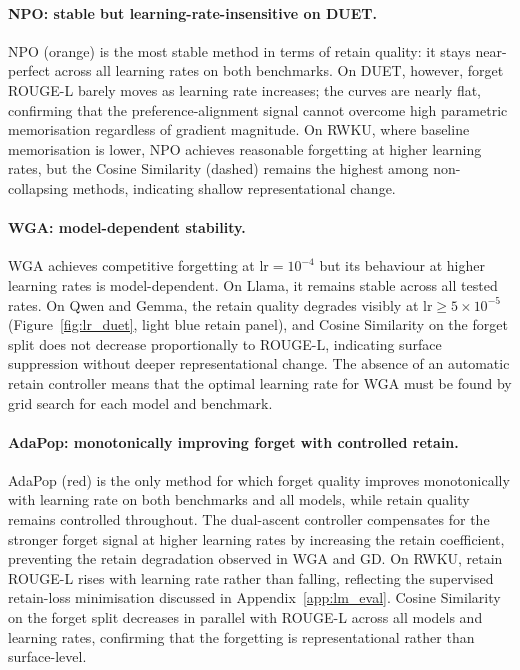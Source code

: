 \paragraph{NPO: stable but learning-rate-insensitive on DUET.}
NPO (orange) is the most stable method in terms of retain quality: it stays near-perfect across all learning rates on both benchmarks. On DUET, however, forget ROUGE-L barely moves as learning rate increases; the curves are nearly flat, confirming that the preference-alignment signal cannot overcome high parametric memorisation regardless of gradient magnitude. On RWKU, where baseline memorisation is lower, NPO achieves reasonable forgetting at higher learning rates, but the Cosine Similarity (dashed) remains the highest among non-collapsing methods, indicating shallow representational change.

\paragraph{WGA: model-dependent stability.}
WGA achieves competitive forgetting at $\text{lr}=10^{-4}$ but its behaviour at higher learning rates is model-dependent. On Llama, it remains stable across all tested rates. On Qwen and Gemma, the retain quality degrades visibly at $\text{lr} \geq 5{\times}10^{-5}$ (Figure~\ref{fig:lr_duet}, light blue retain panel), and Cosine Similarity on the forget split does not decrease proportionally to ROUGE-L, indicating surface suppression without deeper representational change. The absence of an automatic retain controller means that the optimal learning rate for WGA must be found by grid search for each model and benchmark.

\paragraph{AdaPop: monotonically improving forget with controlled retain.}
AdaPop (red) is the only method for which forget quality improves monotonically with learning rate on both benchmarks and all models, while retain quality remains controlled throughout. The dual-ascent controller compensates for the stronger forget signal at higher learning rates by increasing the retain coefficient, preventing the retain degradation observed in WGA and GD. On RWKU, retain ROUGE-L rises with learning rate rather than falling, reflecting the supervised retain-loss minimisation discussed in Appendix~\ref{app:lm_eval}. Cosine Similarity on the forget split decreases in parallel with ROUGE-L across all models and learning rates, confirming that the forgetting is representational rather than surface-level.

